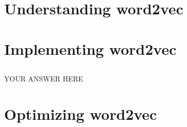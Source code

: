 \documentclass{article}
\begin{document}
\section{Understanding word2vec}
\subsection{}


\subsection{}


\subsection{}


\subsection{}


\subsection{}


\subsection{}


\section{Implementing word2vec}
\setcounter{subsection}{4}
\subsection{}
YOUR ANSWER HERE
\section{Optimizing word2vec}
\subsection{}

\subsection{}

\newpage


\end{document}
